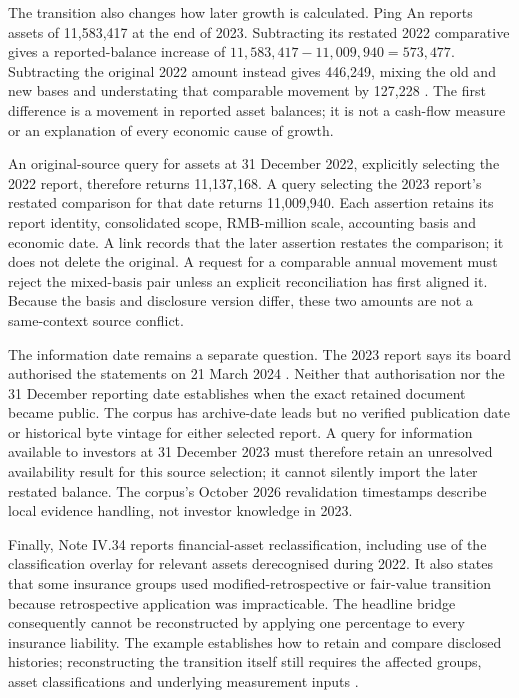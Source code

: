 The transition also changes how later growth is calculated. Ping An reports
assets of 11,583,417 at the end of 2023. Subtracting its restated 2022
comparative gives a reported-balance increase of
$11,583,417-11,009,940=573,477$. Subtracting the original 2022 amount instead
gives 446,249, mixing the old and new bases and understating that comparable
movement by 127,228 \citep[p.~141]{pingan2023asbe}. The first difference is
a movement in reported asset balances; it is not a cash-flow measure or an
explanation of every economic cause of growth.

An original-source query for assets at 31 December 2022, explicitly selecting
the 2022 report, therefore returns 11,137,168. A query selecting the 2023
report's restated comparison for that date returns 11,009,940. Each assertion
retains its report identity, consolidated scope, RMB-million scale, accounting
basis and economic date. A link records that the later assertion restates the
comparison; it does not delete the original. A request for a comparable annual
movement must reject the mixed-basis pair unless an explicit reconciliation
has first aligned it. Because the basis and disclosure version differ, these
two amounts are not a same-context source conflict.

The information date remains a separate question. The 2023 report says its
board authorised the statements on 21 March 2024
\citep[Note I, p.~154]{pingan2023asbe}. Neither that authorisation nor the
31 December reporting date establishes when the exact retained document became
public. The corpus has archive-date leads but no verified publication date or
historical byte vintage for either selected report. A query for information
available to investors at 31 December 2023 must therefore retain an unresolved
availability result for this source selection; it cannot silently import the
later restated balance. The corpus's October 2026 revalidation timestamps
describe local evidence handling, not investor knowledge in 2023.

Finally, Note IV.34 reports financial-asset reclassification, including use of
the classification overlay for relevant assets derecognised during 2022. It
also states that some insurance groups used modified-retrospective or
fair-value transition because retrospective application was impracticable.
The headline bridge consequently cannot be reconstructed by applying one
percentage to every insurance liability. The example establishes how to retain
and compare disclosed histories; reconstructing the transition itself still
requires the affected groups, asset classifications and underlying measurement
inputs \citep[Note IV.34, p.~192]{pingan2023asbe}.

